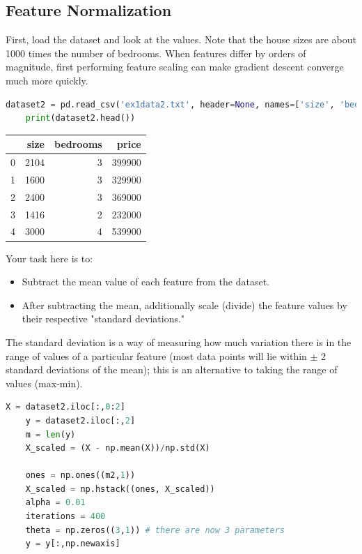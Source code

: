 \documentclass{article}
\begin{document}
\subsection{Feature Normalization}
First, load the dataset and look at the values. Note that the house sizes are about 1000 times the number of bedrooms. When features differ by orders of magnitude, first performing feature scaling can make gradient descent converge much more quickly.

\begin{lstlisting}[language = Python]
    dataset2 = pd.read_csv('ex1data2.txt', header=None, names=['size', 'bedrooms', 'price'])
    print(dataset2.head())
\end{lstlisting}

\begin{table}[h!]
  \centering
  \begin{tabular}{ r r r r } 
     & size & bedrooms & price \\
    \hline
    0 & 2104 & 3 & 399900 \\
    1 & 1600 & 3 & 329900 \\
    2 & 2400 & 3 & 369000 \\
    3 & 1416 & 2 & 232000 \\
    4 & 3000 & 4 & 539900 \\
    \hline
  \end{tabular}
\end{table}

Your task here is to:
\begin{itemize}
  \item Subtract the mean value of each feature from the dataset.
  \item After subtracting the mean, additionally scale (divide) the feature values by their respective "standard deviations."
\end{itemize}

The standard deviation is a way of measuring how much variation there is in the range of values of a particular feature (most data points will lie within $\pm$ 2 standard deviations of the mean); this is an alternative to taking the range of values (max-min).

\begin{lstlisting}[language=Python]
    X = dataset2.iloc[:,0:2] 
    y = dataset2.iloc[:,2]
    m = len(y)
    X_scaled = (X - np.mean(X))/np.std(X)

    ones = np.ones((m2,1))
    X_scaled = np.hstack((ones, X_scaled))
    alpha = 0.01
    iterations = 400
    theta = np.zeros((3,1)) # there are now 3 parameters
    y = y[:,np.newaxis]
\end{lstlisting}
\end{document}
